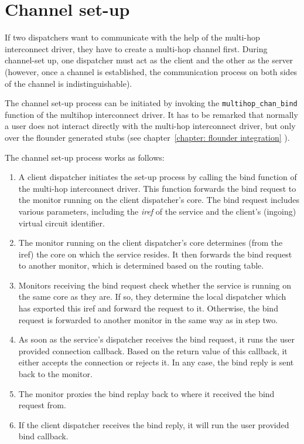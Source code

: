 \documentclass[a4paper,twoside]{report} %
\begin{document}
\section{Channel set-up}
\label{section: set-up}
If two dispatchers want to communicate with the help of the multi-hop interconnect driver, they have to create a multi-hop channel first. During channel-set up, one dispatcher must act as the client and the other as the server (however, once a channel is established, the communication process on both sides of the channel is indistinguishable). 

The channel set-up process can be initiated by invoking the \texttt{multihop\_chan\_bind} function of the multihop interconnect driver. It has to be remarked that normally a user does not interact directly with the multi-hop interconnect driver, but only over the flounder generated stubs (see chapter~\ref{chapter: flounder integration} ).


The channel set-up process works as follows:

\begin{enumerate}

\item A client dispatcher initiates the set-up process by calling the bind function of the multi-hop interconnect driver. This function forwards the bind request to the monitor running on the client dispatcher's core. The bind request includes various parameters, including the \emph{iref} of the service and the client's (ingoing) virtual circuit identifier.

\item The monitor running on the client dispatcher's core determines (from the iref) the core on which the service resides. It then forwards the bind request to another monitor, which is determined based on the routing table.

\item Monitors receiving the bind request check whether the service is running on the same core as they are. If so, they determine the local dispatcher which has exported this iref and forward the request to it. Otherwise, the bind request is forwarded to another monitor in the same way as in step two.

\item As soon as the service's dispatcher receives the bind request, it runs the user provided connection callback. Based on the return value of this callback, it either accepts the connection or rejects it. In any case, the bind reply is sent back to the monitor.

\item The monitor proxies the bind replay back to where it received the bind request from.

\item If the client dispatcher receives the bind reply, it will run the user provided bind callback.

\end{enumerate}
\end{document}
